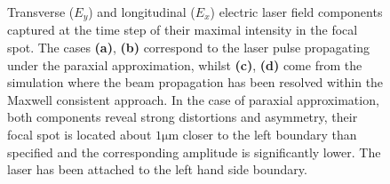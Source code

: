 \begin{figure}[h!]
	\hspace{2mm}
	\caption{Transverse ($ E_{y} $) and longitudinal ($ E_{x} $) electric laser field components captured at the time step of their maximal intensity in the focal spot. The cases \textbf{(a)}, \textbf{(b)} correspond to the laser pulse propagating under the paraxial approximation, whilst \textbf{(c)}, \textbf{(d)} come from the simulation where the beam propagation has been resolved within the Maxwell consistent approach. In the case of paraxial approximation, both components reveal strong distortions and asymmetry, their focal spot is located about $ \mathrm{1 \mu m} $ closer to the left boundary than specified and the corresponding amplitude is significantly lower. The laser has been attached to the left hand side boundary.}
	\label{fig:1}
\end{figure}

